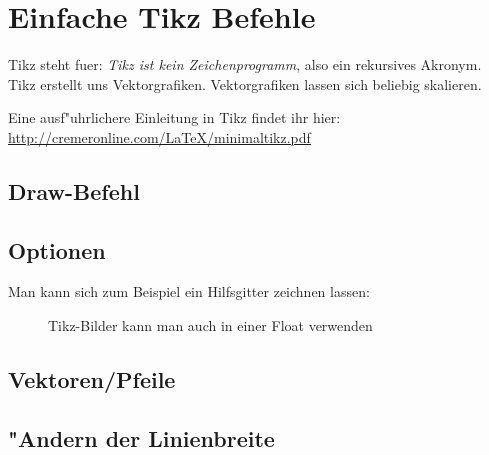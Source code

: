 \documentclass[10pt]{article}
\begin{document}
\section{Einfache Tikz Befehle}
Tikz steht fuer: \textit{Tikz ist kein Zeichenprogramm}, also ein rekursives Akronym. Tikz erstellt uns Vektorgrafiken. Vektorgrafiken lassen sich beliebig skalieren.

Eine ausf"uhrlichere Einleitung in Tikz findet ihr hier: \url{http://cremeronline.com/LaTeX/minimaltikz.pdf}


\subsection{Draw-Befehl}

\subsection{Optionen}

Man kann sich zum Beispiel ein Hilfsgitter zeichnen lassen:


\begin{figure}[h]
\centering
{}
\caption{Tikz-Bilder kann man auch in einer Float verwenden}
\end{figure}

\subsection{Vektoren/Pfeile}


\subsection{"Andern der Linienbreite}
\end{document}
